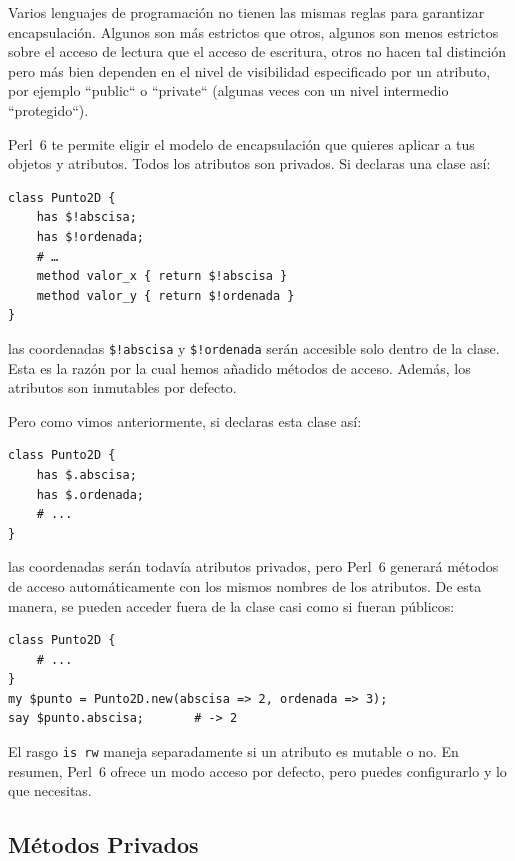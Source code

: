 Varios lenguajes de programación no tienen las mismas reglas para
garantizar encapsulación. Algunos son más estrictos que otros,
algunos son menos estrictos sobre el acceso de lectura que el
acceso de escritura, otros no hacen tal distinción pero más bien
dependen en el nivel de visibilidad especificado por un atributo,
por ejemplo ``public`` o ``private`` (algunas veces con un nivel 
intermedio ``protegido``).

Perl~6 te permite eligir el modelo de encapsulación que quieres
aplicar a tus objetos y atributos. Todos los atributos son 
privados. Si declaras una clase así:

\begin{verbatim}
class Punto2D {
    has $!abscisa;
    has $!ordenada;
    # …
    method valor_x { return $!abscisa }
    method valor_y { return $!ordenada }
}
\end{verbatim}

las coordenadas \verb|$!abscisa| y \verb|$!ordenada|
serán accesible solo dentro de la clase. Esta es la 
razón por la cual hemos añadido métodos de acceso.
Además, los atributos son inmutables por defecto.

Pero como vimos anteriormente, si declaras
esta clase así:

\begin{verbatim}
class Punto2D {
    has $.abscisa;
    has $.ordenada;
    # ...
}
\end{verbatim}

las coordenadas serán todavía atributos privados, pero
Perl~6 generará métodos de acceso automáticamente con los
mismos nombres de los atributos. De esta manera, se pueden
acceder fuera de la clase casi como si fueran públicos:

\begin{verbatim}
class Punto2D {
    # ...
}
my $punto = Punto2D.new(abscisa => 2, ordenada => 3);
say $punto.abscisa;       # -> 2
\end{verbatim}

El rasgo {\tt is rw} maneja separadamente si un atributo 
es mutable o no. En resumen, Perl~6 ofrece un modo acceso por
defecto, pero puedes configurarlo y lo que necesitas.


\subsection{Métodos Privados}

